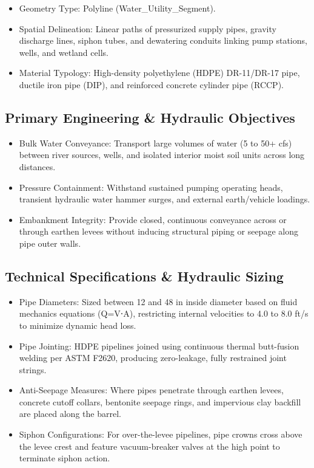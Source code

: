 \documentclass[
  letterpaper,
  DIV=11,
  numbers=noendperiod]{scrreprt}
\begin{document}
\begin{itemize}
\item
  Geometry Type: Polyline (Water\_Utility\_Segment).
\item
  Spatial Delineation: Linear paths of pressurized supply pipes, gravity
  discharge lines, siphon tubes, and dewatering conduits linking pump
  stations, wells, and wetland cells.
\item
  Material Typology: High-density polyethylene (HDPE) DR-11/DR-17 pipe,
  ductile iron pipe (DIP), and reinforced concrete cylinder pipe (RCCP).
\end{itemize}

\subsection{Primary Engineering \& Hydraulic
Objectives}\label{primary-engineering-hydraulic-objectives-1}

\begin{itemize}
\item
  Bulk Water Conveyance: Transport large volumes of water (5 to 50+ cfs)
  between river sources, wells, and isolated interior moist soil units
  across long distances.
\item
  Pressure Containment: Withstand sustained pumping operating heads,
  transient hydraulic water hammer surges, and external earth/vehicle
  loadings.
\item
  Embankment Integrity: Provide closed, continuous conveyance across or
  through earthen levees without inducing structural piping or seepage
  along pipe outer walls.
\end{itemize}

\subsection{Technical Specifications \& Hydraulic
Sizing}\label{technical-specifications-hydraulic-sizing}

\begin{itemize}
\item
  Pipe Diameters: Sized between 12 and 48 in inside diameter based on
  fluid mechanics equations (Q=V⋅A), restricting internal velocities to
  4.0 to 8.0 ft/s to minimize dynamic head loss.
\item
  Pipe Jointing: HDPE pipelines joined using continuous thermal
  butt-fusion welding per ASTM F2620, producing zero-leakage, fully
  restrained joint strings.
\item
  Anti-Seepage Measures: Where pipes penetrate through earthen levees,
  concrete cutoff collars, bentonite seepage rings, and impervious clay
  backfill are placed along the barrel.
\item
  Siphon Configurations: For over-the-levee pipelines, pipe crowns cross
  above the levee crest and feature vacuum-breaker valves at the high
  point to terminate siphon action.
\end{itemize}
\end{document}
